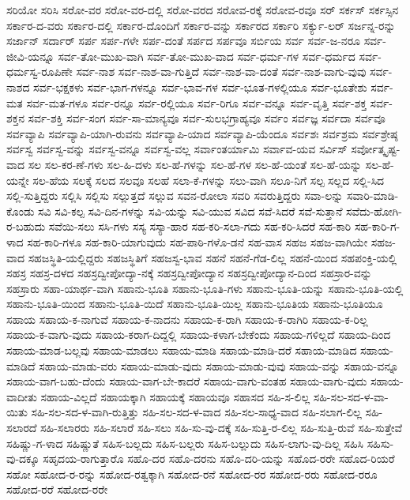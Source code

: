 {ಸರಿಯೋ
ಸರಿಸಿ
ಸರೋ-ವರ
ಸರೋ-ವರ-ದಲ್ಲಿ
ಸರೋ-ವರದ
ಸರೋವ-ರಕ್ಕೆ
ಸರೋವ-ರವೂ
ಸರ್
ಸರ್ಕಸ್
ಸರ್ಕಸ್ಸಿನ
ಸರ್ಕಾರ-ದ-ವರು
ಸರ್ಕಾರ-ದಲ್ಲಿ
ಸರ್ಕಾರ-ದೊಂದಿಗೆ
ಸರ್ಕಾರ-ವನ್ನು
ಸರ್ಕಾರದ
ಸರ್ಕಾರಿ
ಸರ್ಕ್ಯು-ಲರ್
ಸರ್ಜನ್ನ-ರನ್ನು
ಸರ್ಜಾನ್
ಸರ್ದಾರ್
ಸರ್ಪ
ಸರ್ಪ-ಗಳೇ
ಸರ್ಪ-ದಂತೆ
ಸರ್ಪದ
ಸರ್ಪವೂ
ಸರ್ಬಿಯ
ಸರ್ವ
ಸರ್ವ-ಜ-ನರೂ
ಸರ್ವ-ಜೀವಿ-ಯನ್ನೂ
ಸರ್ವ-ತೋ-ಮುಖ-ವಾಗಿ
ಸರ್ವ-ತೋ-ಮುಖ-ವಾದ
ಸರ್ವ-ಧರ್ಮ-ಗಳ
ಸರ್ವ-ಧರ್ಮದ
ಸರ್ವ-ಧರ್ಮಸ್ವ-ರೂಪಿಣೇ
ಸರ್ವ-ನಾಶ
ಸರ್ವ-ನಾಶ-ವಾ-ಗುತ್ತಿದೆ
ಸರ್ವ-ನಾಶ-ವಾ-ದಂತೆ
ಸರ್ವ-ನಾಶ-ವಾಗು-ವುವು
ಸರ್ವ-ನಾಶದ
ಸರ್ವ-ಭಕ್ಷಕಳು
ಸರ್ವ-ಭಾಗ-ಗಳನ್ನೂ
ಸರ್ವ-ಭಾವ-ಗಳ
ಸರ್ವ-ಭೂತ-ಗಳಲ್ಲಿಯೂ
ಸರ್ವ-ಭೂತೇಶು
ಸರ್ವ-ಮತ
ಸರ್ವ-ಮತ-ಗಳೂ
ಸರ್ವ-ರನ್ನೂ
ಸರ್ವ-ರಲ್ಲಿಯೂ
ಸರ್ವ-ರಿಗೂ
ಸರ್ವ-ವನ್ನೂ
ಸರ್ವ-ವೃತ್ತಿ
ಸರ್ವ-ಶಕ್ತ
ಸರ್ವ-ಶಕ್ತನ
ಸರ್ವ-ಶಕ್ತಿ
ಸರ್ವ-ಸಂಗ
ಸರ್ವ-ಸಾ-ಮಾನ್ಯವೂ
ಸರ್ವ-ಸುಲಭಗ್ರಾಹ್ಯವೂ
ಸರ್ವಂ
ಸರ್ವಜ್ಞ
ಸರ್ವದಾ
ಸರ್ವವೂ
ಸರ್ವವ್ಯಾಪಿ
ಸರ್ವವ್ಯಾಪಿ-ಯಾಗಿ-ರುವನು
ಸರ್ವವ್ಯಾಪಿ-ಯಾದ
ಸರ್ವವ್ಯಾಪಿ-ಯೆಂದೂ
ಸರ್ವಶಃ
ಸರ್ವಶ್ರಮ
ಸರ್ವಶ್ರೇಷ್ಠ
ಸರ್ವಸ್ವ
ಸರ್ವಸ್ವ-ವನ್ನು
ಸರ್ವಸ್ವ-ವನ್ನೂ
ಸರ್ವಸ್ವ-ವಲ್ಲ
ಸರ್ವಾಂತರ್ಯಾಮಿ
ಸರ್ವಾವ-ಯವ
ಸರ್ವಿಸ್
ಸರ್ವೋತ್ಕೃಷ್ಟ-ವಾದ
ಸಲ
ಸಲ-ಕರ-ಣೆ-ಗಳು
ಸಲ-ಹಿ-ದಳು
ಸಲ-ಹೆ-ಗಳನ್ನು
ಸಲ-ಹೆ-ಗಳ
ಸಲ-ಹೆ-ಯಂತೆ
ಸಲ-ಹೆ-ಯನ್ನು
ಸಲ-ಹೆ-ಯನ್ನೇ
ಸಲ-ಹೆಯ
ಸಲಕ್ಕೆ
ಸಲದ
ಸಲವೂ
ಸಲಹೆ
ಸಲಾ-ಕೆ-ಗಳನ್ನು
ಸಲು-ವಾಗಿ
ಸಲೂ-ನಿಗೆ
ಸಲ್ಪ
ಸಲ್ಲದ
ಸಲ್ಲಿ-ಸಿದ
ಸಲ್ಲಿ-ಸುತ್ತಿದ್ದರು
ಸಲ್ಲಿಸಿ
ಸಲ್ಲಿಸು
ಸಲ್ಲುತ್ತದೆ
ಸಲ್ಲುವ
ಸವನ-ರೋಲಾ
ಸವರಿ
ಸವರುತ್ತಿದ್ದರು
ಸವಾ-ಲನ್ನು
ಸವಾರಿ-ಮಾಡಿ-ಕೊಂಡು
ಸವಿ
ಸವಿ-ಕಲ್ಪ
ಸವಿ-ದಿನ-ಗಳನ್ನು
ಸವಿ-ಯನ್ನು
ಸವಿ-ಯುವ
ಸವಿದ
ಸವೆ-ಸಿದರೆ
ಸವೆ-ಸುತ್ತಾನೆ
ಸವೆದು-ಹೋಗಿ-ರ-ಬಹುದು
ಸವೆಯಿ-ಸಲು
ಸಸಿ-ಗಳು
ಸಸ್ಯ
ಸಸ್ಯಾ-ಹಾರ
ಸಹ-ಕರಿ-ಸಲಾ-ಗದು
ಸಹ-ಕರಿ-ಸಿದರೆ
ಸಹ-ಕಾರಿ
ಸಹ-ಕಾರಿ-ಗ-ಳಾದ
ಸಹ-ಕಾರಿ-ಗಳೂ
ಸಹ-ಕಾರಿ-ಯಾಗುವುದು
ಸಹ-ಪಾಠಿ-ಗಳೊ-ಡನೆ
ಸಹ-ವಾಸ
ಸಹಜ
ಸಹಜ-ವಾಗಿಯೇ
ಸಹಜ-ವಾದ
ಸಹಜಸ್ಥಿತಿ-ಯಲ್ಲಿದ್ದರು
ಸಹಜಸ್ಥಿತಿಗೆ
ಸಹಜಸ್ವ-ಭಾವ
ಸಹನೆ
ಸಹನೆ-ಗೆಡ-ಲಿಲ್ಲ
ಸಹನೆ-ಯಿಂದ
ಸಹಪಂಕ್ತಿ-ಯಲ್ಲಿ
ಸಹಸ್ರ
ಸಹಸ್ರ-ದಳದ
ಸಹಸ್ರದ್ವೀಪೋದ್ಯಾ-ನಕ್ಕೆ
ಸಹಸ್ರದ್ವೀಪೋದ್ಯಾನ
ಸಹಸ್ರದ್ವೀಪೋದ್ಯಾನ-ದಿಂದ
ಸಹಸ್ರಾರ-ವನ್ನು
ಸಹಸ್ರಾರು
ಸಹಾ-ಯಾರ್ಥ-ವಾಗಿ
ಸಹಾನು-ಭೂತಿ
ಸಹಾನು-ಭೂತಿ-ಗಳು
ಸಹಾನು-ಭೂತಿ-ಯನ್ನು
ಸಹಾನು-ಭೂತಿ-ಯಲ್ಲಿ
ಸಹಾನು-ಭೂತಿ-ಯಿಂದ
ಸಹಾನು-ಭೂತಿ-ಯಿದೆ
ಸಹಾನು-ಭೂತಿ-ಯಿಲ್ಲ
ಸಹಾನು-ಭೂತಿಯ
ಸಹಾನು-ಭೂತಿಯೂ
ಸಹಾಯ
ಸಹಾಯ-ಕ-ನಾಗುವೆ
ಸಹಾಯ-ಕ-ನಾದನು
ಸಹಾಯ-ಕ-ರಾಗಿ
ಸಹಾಯ-ಕ-ರಾಗಿರಿ
ಸಹಾಯ-ಕ-ರಿಲ್ಲ
ಸಹಾಯ-ಕ-ವಾಗು-ವುದು
ಸಹಾಯ-ಕರಾಗ-ದಿದ್ದಲ್ಲಿ
ಸಹಾಯ-ಕಳಾಗ-ಬೇಕೆಂದು
ಸಹಾಯ-ಗಳಿಲ್ಲದೆ
ಸಹಾಯ-ದಿಂದ
ಸಹಾಯ-ಮಾಡ-ಬಲ್ಲವು
ಸಹಾಯ-ಮಾಡಲು
ಸಹಾಯ-ಮಾಡಿ
ಸಹಾಯ-ಮಾಡಿ-ದರೆ
ಸಹಾಯ-ಮಾಡಿದ
ಸಹಾಯ-ಮಾಡಿದೆ
ಸಹಾಯ-ಮಾಡು-ವರು
ಸಹಾಯ-ಮಾಡು-ವುದು
ಸಹಾಯ-ಮಾಡು-ವುವು
ಸಹಾಯ-ವನ್ನು
ಸಹಾಯ-ವನ್ನೂ
ಸಹಾಯ-ವಾಗ-ಬಹು-ದೆಂದು
ಸಹಾಯ-ವಾಗ-ಬೇ-ಕಾದರೆ
ಸಹಾಯ-ವಾಗು-ವಂತಹ
ಸಹಾಯ-ವಾಗು-ವುದು
ಸಹಾಯ-ವಾದೀತು
ಸಹಾಯ-ವಿಲ್ಲದೆ
ಸಹಾಯಕ್ಕಾಗಿ
ಸಹಾಯಕ್ಕೆ
ಸಹಾಯವೂ
ಸಹಾಸದ
ಸಹಿ-ಸ-ಲಿಲ್ಲ
ಸಹಿ-ಸಲ-ಸದ-ಳ-ವಾ-ಯಿತು
ಸಹಿ-ಸಲ-ಸದ-ಳ-ವಾಗಿ-ರುತ್ತಿತ್ತು
ಸಹಿ-ಸಲ-ಸದ-ಳ-ವಾದ
ಸಹಿ-ಸಲ-ಸಾಧ್ಯ-ವಾದ
ಸಹಿ-ಸಲಾಗ-ಲಿಲ್ಲ
ಸಹಿ-ಸಲಾರದೆ
ಸಹಿ-ಸಲಾರರು
ಸಹಿ-ಸಲಾರೆ
ಸಹಿ-ಸಲು
ಸಹಿ-ಸು-ವು-ದಕ್ಕೆ
ಸಹಿ-ಸುತ್ತಿ-ರ-ಲಿಲ್ಲ
ಸಹಿ-ಸುತ್ತಿ-ರುವೆ
ಸಹಿ-ಸುತ್ತೇವೆ
ಸಹಿಷ್ಣು-ಗ-ಳಾದ
ಸಹಿಷ್ಣುತೆ
ಸಹಿಸ-ಬಲ್ಲದು
ಸಹಿಸ-ಬಲ್ಲರು
ಸಹಿಸ-ಬಲ್ಲುದು
ಸಹಿಸ-ಲಾಗು-ವು-ದಿಲ್ಲ
ಸಹಿಸಿ
ಸಹಿಸು-ವು-ದಕ್ಕೂ
ಸಹೃದಯ-ರಾಗುತ್ತಾರೊ
ಸಹೊ-ದರ
ಸಹೊ-ದರನು
ಸಹೊ-ದರಿ-ಯನ್ನು
ಸಹೊದ-ರರೇ
ಸಹೊದ-ರಿಯರೆ
ಸಹೋ
ಸಹೋದ-ರ-ರನ್ನು
ಸಹೋದ-ರತ್ವಕ್ಕಾಗಿ
ಸಹೋದ-ರನೆ
ಸಹೋದ-ರರ
ಸಹೋದ-ರರು
ಸಹೋದ-ರರೂ
ಸಹೋದ-ರರೆ
ಸಹೋದ-ರರೇ
}
